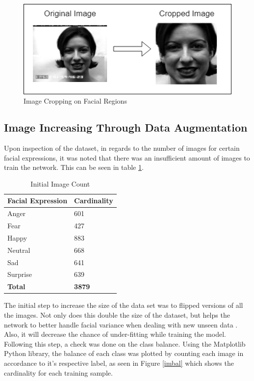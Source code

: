 \begin{figure}[ht]
	\begin{center}
		\advance\leftskip-3cm
		\advance\rightskip-3cm
		\includegraphics[keepaspectratio=true,scale=0.9]{__resources/DATASET/crop.png}
		\caption{Image Cropping on Facial Regions}
		\label{crop}
	\end{center}
\end{figure}
\newpage


\subsection{Image Increasing Through Data Augmentation}
Upon inspection of the dataset, in regards to the number of images for certain facial expressions, it was noted that there was an insufficient amount of images to train the network. This can be seen in table \ref{table: count}. 
\begin{table}[ht]
	\begin{tabular}{ |p{10cm}||p{3cm}|}
		\hline
		\textbf{Facial Expression} & \textbf{Cardinality}\\
		\hline
		\hline
		Anger & 601 \\
		\hline
		Fear & 427	\\
		\hline
		Happy & 883\\
		\hline
		Neutral & 668\\
		\hline
		Sad & 641	\\
		\hline
		Surprise  & 639	\\
		\hline
		\textbf{Total}  & \textbf{3879}	\\
		\hline
	\end{tabular}
	\caption{Initial Image Count}
	\label{table: count}
\end{table}

The initial step to increase the size of the data set was to flipped versions of all the images. Not only does this double the size of the dataset, but helps the network to better handle facial variance when dealing with new unseen data \citep{LOPES}. Also, it will decrease the chance of under-fitting while training the model. Following this step, a check was done on the class balance. Using the Matplotlib Python library, the balance of each class was plotted by counting each image in accordance to it's respective label, as seen in Figure \ref{imbal} which shows the cardinality for each training sample.

